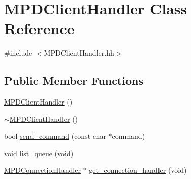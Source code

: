 \hypertarget{classMPDClientHandler}{
\section{\-M\-P\-D\-Client\-Handler \-Class \-Reference}
\label{classMPDClientHandler}
}


{\ttfamily \#include $<$\-M\-P\-D\-Client\-Handler.\-hh$>$}

\subsection*{\-Public \-Member \-Functions}
\begin{DoxyCompactItemize}
\item 
\hyperlink{classMPDClientHandler_abd756d3ebc5c05b089210b0a123fbb5c}{\-M\-P\-D\-Client\-Handler} ()
\item 
\hyperlink{classMPDClientHandler_a5543318862c27db00bf0890fa7694662}{$\sim$\-M\-P\-D\-Client\-Handler} ()
\item 
bool \hyperlink{classMPDClientHandler_a33c32dc5022572c10b07f7685bad48fe}{send\-\_\-command} (const char $\ast$command)
\item 
void \hyperlink{classMPDClientHandler_a47f1ac6da7596e7e29802e25f2a78ad8}{list\-\_\-queue} (void)
\item 
\hyperlink{classMPDConnectionHandler}{\-M\-P\-D\-Connection\-Handler} $\ast$ \hyperlink{classMPDClientHandler_a1cf4a86afb7ba347fc078c14e1812b6f}{get\-\_\-connection\-\_\-handler} (void)
\end{DoxyCompactItemize}


